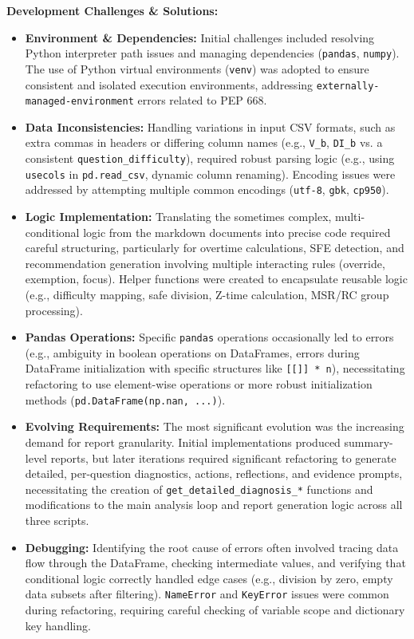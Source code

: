 \documentclass{article}
\begin{document}
\textbf{Development Challenges \& Solutions:}
\begin{itemize}
    \item \textbf{Environment \& Dependencies:} Initial challenges included resolving Python interpreter path issues and managing dependencies (\texttt{pandas}, \texttt{numpy}). The use of Python virtual environments (\texttt{venv}) was adopted to ensure consistent and isolated execution environments, addressing \texttt{externally-managed-environment} errors related to PEP 668.
    \item \textbf{Data Inconsistencies:} Handling variations in input CSV formats, such as extra commas in headers or differing column names (e.g., \texttt{V\_b}, \texttt{DI\_b} vs. a consistent \texttt{question\_difficulty}), required robust parsing logic (e.g., using \texttt{usecols} in \texttt{pd.read\_csv}, dynamic column renaming). Encoding issues were addressed by attempting multiple common encodings (\texttt{utf-8}, \texttt{gbk}, \texttt{cp950}).
    \item \textbf{Logic Implementation:} Translating the sometimes complex, multi-conditional logic from the markdown documents into precise code required careful structuring, particularly for overtime calculations, SFE detection, and recommendation generation involving multiple interacting rules (override, exemption, focus). Helper functions were created to encapsulate reusable logic (e.g., difficulty mapping, safe division, Z-time calculation, MSR/RC group processing).
    \item \textbf{Pandas Operations:} Specific \texttt{pandas} operations occasionally led to errors (e.g., ambiguity in boolean operations on DataFrames, errors during DataFrame initialization with specific structures like \texttt{[[]] * n}), necessitating refactoring to use element-wise operations or more robust initialization methods (\texttt{pd.DataFrame(np.nan, ...)}).
    \item \textbf{Evolving Requirements:} The most significant evolution was the increasing demand for report granularity. Initial implementations produced summary-level reports, but later iterations required significant refactoring to generate detailed, per-question diagnostics, actions, reflections, and evidence prompts, necessitating the creation of \texttt{get\_detailed\_diagnosis\_*} functions and modifications to the main analysis loop and report generation logic across all three scripts.
    \item \textbf{Debugging:} Identifying the root cause of errors often involved tracing data flow through the DataFrame, checking intermediate values, and verifying that conditional logic correctly handled edge cases (e.g., division by zero, empty data subsets after filtering). \texttt{NameError} and \texttt{KeyError} issues were common during refactoring, requiring careful checking of variable scope and dictionary key handling.
\end{itemize}
\end{document}
